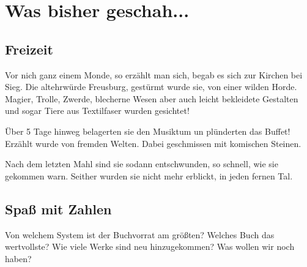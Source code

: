 
%



\usepackage{enumitem}









%



\makemultititle
%

\section{Was bisher geschah...}

\subsection{Freizeit}
Vor nich ganz einem Monde, so erzählt man sich, begab es sich zur Kirchen bei Sieg.
Die altehrwürde Freusburg, gestürmt wurde sie, von einer wilden Horde.
Magier, Trolle, Zwerde, blecherne Wesen aber auch leicht bekleidete Gestalten und sogar Tiere aus Textilfaser wurden gesichtet!

Über 5 Tage hinweg belagerten sie den Musiktum un plünderten das Buffet!
Erzählt wurde von fremden Welten.
Dabei geschmissen mit komischen Steinen.

Nach dem letzten Mahl sind sie sodann entschwunden, so schnell, wie sie gekommen warn.
Seither wurden sie nicht mehr erblickt, in jeden fernen Tal.

\subsection{Spaß mit Zahlen}
Von welchem System ist der Buchvorrat am größten?
Welches Buch das wertvollste?
Wie viele Werke sind neu hinzugekommen?
Was wollen wir noch haben?

